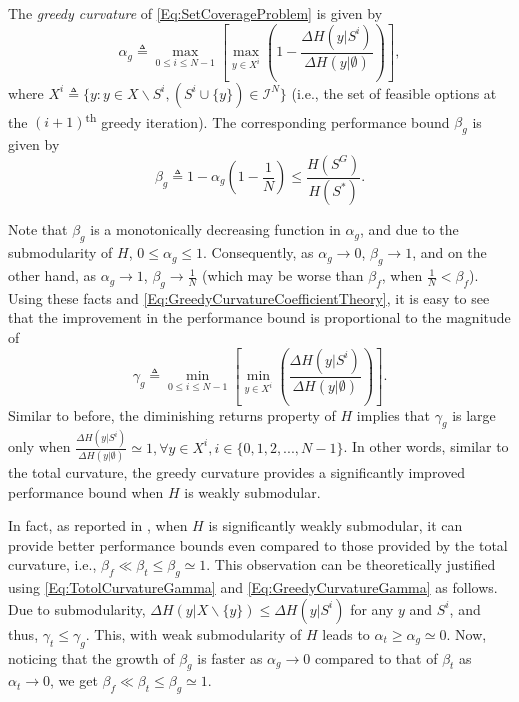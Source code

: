 \documentclass[letterpaper, 10 pt, conference]{ieeeconf}
\newcommand{\tsup}[1]{\textsuperscript{#1}}
\begin{document}
The \emph{greedy curvature} of \eqref{Eq:SetCoverageProblem} is given by   
\begin{equation}\label{Eq:GreedyCurvatureCoefficientTheory}
    \alpha_g \triangleq \max_{0 \leq i \leq N-1} \left[ \max_{y \in X^i}\left(1 - \frac{\Delta H(y\vert S^i)}{\Delta H(y\vert \emptyset)}\right) \right],
\end{equation}
where $X^i \triangleq \{y: y \in X \backslash S^i, (S^i \cup \{y\}) \in \mathcal{I}^N\}$ (i.e., the set of feasible options at the $(i+1)$\tsup{th} greedy iteration). The corresponding performance bound $\beta_g$ is given by  
\begin{equation}\label{Eq:GreedyCurvatureBoundTheory}
    \beta_g \triangleq 1-\alpha_g\left(1-\frac{1}{N}\right) \leq \frac{H(S^G)}{H(S^*)}. 
\end{equation}



Note that $\beta_g$ is a monotonically decreasing function in $\alpha_g$, and due to the submodularity of $H$, $0 \leq \alpha_g \leq 1$. Consequently, as $\alpha_g \rightarrow 0$, $\beta_g \rightarrow 1$, and on the other hand, as $\alpha_g \rightarrow 1$, $\beta_g \rightarrow \frac{1}{N}$ (which may be worse than $\beta_f$, when $\frac{1}{N} < \beta_f$). Using these facts and \eqref{Eq:GreedyCurvatureCoefficientTheory}, it is easy to see that the improvement in the performance bound is proportional to the magnitude of 
\begin{equation}\label{Eq:GreedyCurvatureGamma}
    \gamma_g \triangleq \min_{0 \leq i \leq N-1} \left[ \min_{y \in X^i}\left(\frac{\Delta H(y\vert S^i)}{\Delta H(y\vert \emptyset)}\right) \right].
\end{equation}
Similar to before, the diminishing returns property of $H$ implies that $\gamma_g$ is large only when 
$\frac{\Delta H(y\vert S^i)}{\Delta H(y\vert \emptyset)} \simeq 1, \forall y\in X^i, i\in \{0,1,2,...,N-1\}$. In other words, similar to the total curvature, the greedy curvature provides a significantly improved performance bound when $H$ is weakly submodular. 


In fact, as reported in \cite{Sun2020}, when $H$ is significantly weakly submodular, it can provide better performance bounds even compared to those provided by the total curvature, i.e., $\beta_f \ll \beta_t \leq \beta_g \simeq 1$. This observation can be theoretically justified using \eqref{Eq:TotolCurvatureGamma} and \eqref{Eq:GreedyCurvatureGamma} as follows. Due to submodularity, $\Delta H(y \vert X \backslash \{y\}) \leq \Delta H(y\vert S^i)$ for any $y$ and $S^i$, and thus, $\gamma_t \leq \gamma_g$. This, with weak submodularity of $H$ leads to $\alpha_t \geq \alpha_g \simeq 0$. Now, noticing that the growth of $\beta_g$ is faster as $\alpha_g \rightarrow 0$ compared to that of $\beta_t$ as $\alpha_t \rightarrow 0$, we get $\beta_f \ll \beta_t \leq \beta_g \simeq 1$.
\end{document}
